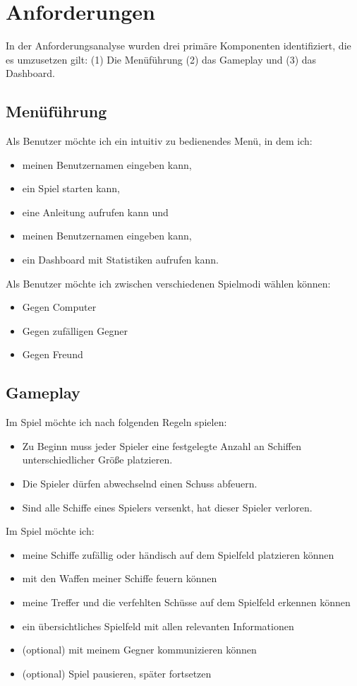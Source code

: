 \documentclass[a4paper, 10pt, conference]{IEEEtran}
\begin{document}
\section{Anforderungen}\label{sec:anforderungen}

In der Anforderungsanalyse wurden drei primäre Komponenten identifiziert, die es umzusetzen gilt: (1) Die Menüführung (2) das Gameplay und (3) das Dashboard.


\subsection{Menüführung}
Als Benutzer möchte ich ein intuitiv zu bedienendes Menü, in dem ich:
\begin{itemize}
	\item meinen Benutzernamen eingeben kann,
	\item ein Spiel starten kann,
	\item eine Anleitung aufrufen kann und
	\item meinen Benutzernamen eingeben kann,
	\item ein Dashboard mit Statistiken aufrufen kann.
\end{itemize}

Als Benutzer möchte ich zwischen verschiedenen Spielmodi wählen können:
\begin{itemize}
	\item Gegen Computer
	\item Gegen zufälligen Gegner
	\item Gegen Freund
\end{itemize}

\subsection{Gameplay}
Im Spiel möchte ich nach folgenden Regeln spielen:
\begin{itemize}
	\item Zu Beginn muss jeder Spieler eine festgelegte Anzahl an Schiffen unterschiedlicher Größe platzieren.
	\item Die Spieler dürfen abwechselnd einen Schuss abfeuern.
	\item Sind alle Schiffe eines Spielers versenkt, hat dieser Spieler verloren.
\end{itemize}

Im Spiel möchte ich:
\begin{itemize}
	\item meine Schiffe zufällig oder händisch auf dem Spielfeld platzieren können
	\item mit den Waffen meiner Schiffe feuern können
	\item meine Treffer und die verfehlten Schüsse auf dem Spielfeld erkennen können
	\item ein übersichtliches Spielfeld mit allen relevanten Informationen 
	\item (optional) mit meinem Gegner kommunizieren können
	\item (optional) Spiel pausieren, später fortsetzen
\end{itemize}
\end{document}
